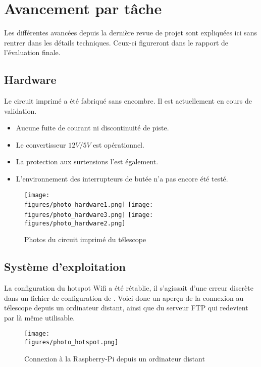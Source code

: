 \chapter{Avancement par tâche}

Les différentes avancées depuis la dernière revue de projet sont expliquées ici sans rentrer dans les détails techniques. Ceux-ci figureront dans le rapport de l'évaluation finale.

\section{Hardware}

Le circuit imprimé a été fabriqué sans encombre. Il est actuellement en cours de validation.

\begin{itemize}[label=$\bullet$]
	\item Aucune fuite de courant ni discontinuité de piste.
	\item Le convertisseur $12V/5V$ est opérationnel.
	\item La protection aux surtensions l'est également.
	\item L'environnement des interrupteurs de butée n'a pas encore été testé.
	\end{itemize}

\begin{figure}[H]
    \centering
	\texttt{[image: \\figures/photo\_hardware1.png]}
	\texttt{[image: \\figures/photo\_hardware3.png]}
	\texttt{[image: \\figures/photo\_hardware2.png]}
    \decoRule
    \caption[
    Photos du circuit imprimé du télescope]{
    Photos du circuit imprimé du télescope}
    \label{fig:Photos du circuit imprimé du télescope}
    \end{figure}

\section{Système d'exploitation}

La configuration du hotspot Wifi a été rétablie, il s'agissait d'une erreur discrète dans un fichier de configuration de . Voici donc un aperçu de la connexion au télescope depuis un ordinateur distant, ainsi que du serveur FTP qui redevient par là même utilisable.

\begin{figure}[H]
    \centering
    \texttt{[image: \\figures/photo\_hotspot.png]}
    \decoRule
    \caption[
    Connexion à la Raspberry-Pi depuis un ordinateur distant]{
    Connexion à la Raspberry-Pi depuis un ordinateur distant}
    \label{fig:Connexion à la Raspberry-Pi depuis un ordinateur distant}
    \end{figure}

